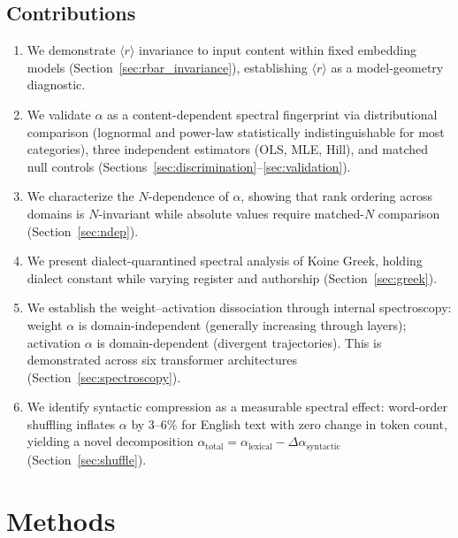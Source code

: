 \documentclass[12pt,letterpaper]{article}
\newcommand{\rbar}{\langle r \rangle}
\newcommand{\al}{\alpha}
\newcommand{\dalpha}{\Delta\alpha}
\begin{document}
\subsection{Contributions}

\begin{enumerate}[leftmargin=*]
\item We demonstrate $\rbar$ invariance to input content within fixed
embedding models (Section~\ref{sec:rbar_invariance}), establishing
$\rbar$ as a model-geometry diagnostic.

\item We validate $\al$ as a content-dependent spectral fingerprint
via distributional comparison (lognormal and power-law
statistically indistinguishable for most categories), three
independent estimators (OLS, MLE, Hill), and matched null controls
(Sections~\ref{sec:discrimination}--\ref{sec:validation}).

\item We characterize the $N$-dependence of $\al$, showing that rank
ordering across domains is $N$-invariant while absolute values
require matched-$N$ comparison (Section~\ref{sec:ndep}).

\item We present dialect-quarantined spectral analysis of Koine
Greek, holding dialect constant while varying register and
authorship (Section~\ref{sec:greek}).

\item We establish the weight--activation dissociation through
internal spectroscopy: weight $\al$ is domain-independent (generally
increasing through layers); activation $\al$ is domain-dependent
(divergent trajectories). This is demonstrated across six transformer
architectures (Section~\ref{sec:spectroscopy}).

\item We identify syntactic compression as a measurable spectral
effect: word-order shuffling inflates $\al$ by 3--6\% for English
text with zero change in token count, yielding a novel decomposition
$\al_{\text{total}} = \al_{\text{lexical}} - \dalpha_{\text{syntactic}}$
(Section~\ref{sec:shuffle}).

\end{enumerate}


\section{Methods}
\label{sec:methods}
\end{document}
